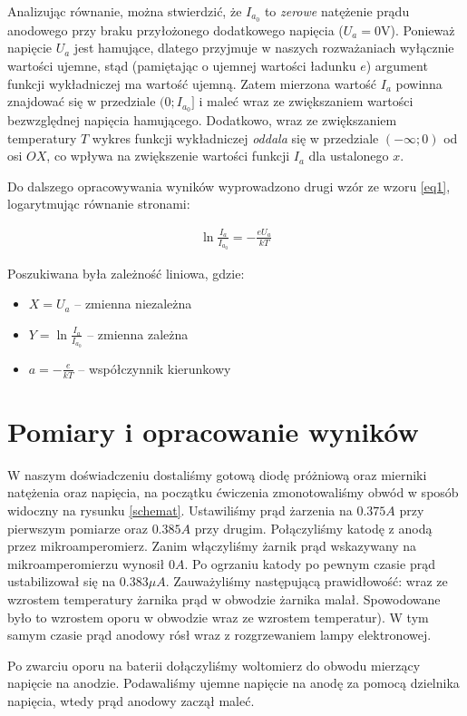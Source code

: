 \documentclass[a4paper]{article}
\newlength{\du}
\begin{document}
Analizując równanie, można stwierdzić, że $I_{a_0}$ to \textit{zerowe} natężenie prądu anodowego przy
braku przyłożonego dodatkowego napięcia ($U_a = 0 \text{V}$). Ponieważ napięcie $U_a$ jest hamujące,
dlatego przyjmuje w naszych rozważaniach wyłącznie wartości ujemne, stąd (pamiętając o ujemnej wartości
ładunku $e$) argument funkcji wykładniczej ma wartość ujemną. Zatem mierzona wartość $I_a$ powinna 
znajdować się w przedziale $(0; I_{a_0}]$ i maleć wraz ze zwiększaniem wartości bezwzględnej
napięcia hamującego. Dodatkowo, wraz ze zwiększaniem temperatury $T$ wykres funkcji wykładniczej
\textit{oddala} się w przedziale $(-\infty; 0)$ od osi $OX$, co wpływa na zwiększenie wartości funkcji
$I_a$ dla ustalonego $x$.

Do dalszego opracowywania wyników wyprowadzono drugi wzór ze wzoru \ref{eq1}, logarytmując równanie
stronami:

\begin{align}
	\ln{\frac{I_a}{I_{a_0}}} = -\frac{e U_a}{k T}
\label{eq2}
\end{align}

Poszukiwana była zależność liniowa, gdzie:
\begin{itemize}
\item $X = U_a$ -- zmienna niezależna
\item $Y = \ln \frac{I_a}{I_{a_0}}$ -- zmienna zależna
\item $a = -\frac{e}{kT}$ -- współczynnik kierunkowy
\end{itemize}


\section{Pomiary i opracowanie wyników}
W naszym doświadczeniu dostaliśmy gotową diodę próżniową oraz mierniki natężenia oraz napięcia,
na początku ćwiczenia zmonotowaliśmy obwód w sposób widoczny na rysunku \ref{schemat}.
Ustawiliśmy prąd żarzenia na $0.375 A$ przy pierwszym pomiarze oraz $0.385 A$ przy drugim.
Połączyliśmy katodę z anodą przez mikroamperomierz.
Zanim włączyliśmy żarnik prąd wskazywany na mikroamperomierzu wynosił $0A$.
Po ogrzaniu katody po pewnym czasie prąd ustabilizował się na $0.383 \mu A$.
Zauważyliśmy następującą prawidłowość: wraz ze wzrostem temperatury żarnika prąd w obwodzie żarnika malał.
Spowodowane było to wzrostem oporu w obwodzie wraz ze wzrostem temperatur).
W tym samym czasie prąd anodowy rósł wraz z rozgrzewaniem lampy elektronowej.

Po zwarciu oporu na baterii dołączyliśmy woltomierz do obwodu mierzący napięcie na anodzie.
Podawaliśmy ujemne napięcie na anodę za pomocą dzielnika napięcia, wtedy prąd anodowy zaczął maleć.
\end{document}
